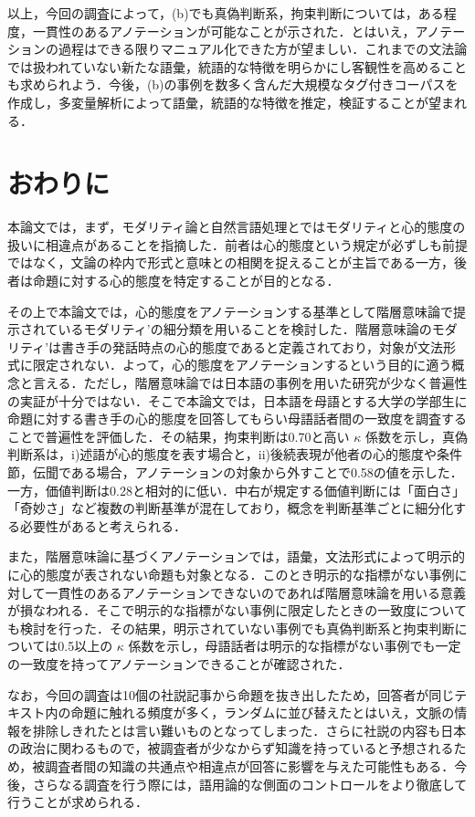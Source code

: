 \documentclass[japanese]{jnlp_1.4}
\begin{document}
以上，今回の調査によって，(b)でも真偽判断系，拘束判断については，ある程度，一貫性のあるアノテーションが可能なことが示された．とはいえ，アノテーションの過程はできる限りマニュアル化できた方が望ましい．これまでの文法論では扱われていない新たな語彙，統語的な特徴を明らかにし客観性を高めることも求められよう．今後，(b)の事例を数多く含んだ大規模なタグ付きコーパスを作成し，多変量解析によって語彙，統語的な特徴を推定，検証することが望まれる．



\section{おわりに}

本論文では，まず，モダリティ論と自然言語処理とではモダリティと心的態度の扱いに相違点があることを指摘した．前者は心的態度という規定が必ずしも前提ではなく，文論の枠内で形式と意味との相関を捉えることが主旨である一方，後者は命題に対する心的態度を特定することが目的となる．

その上で本論文では，心的態度をアノテーションする基準として階層意味論で提示されているモダリティ’の細分類を用いることを検討した．階層意味論のモダリティ’は書き手の発話時点の心的態度であると定義されており，対象が文法形式に限定されない．よって，心的態度をアノテーションするという目的に適う概念と言える．ただし，階層意味論では日本語の事例を用いた研究が少なく普遍性の実証が十分ではない．そこで本論文では，日本語を母語とする大学の学部生に命題に対する書き手の心的態度を回答してもらい母語話者間の一致度を調査することで普遍性を評価した．その結果，拘束判断は0.70と高い $\kappa$ 係数を示し，真偽判断系は，i)述語が心的態度を表す場合と，ii)後続表現が他者の心的態度や条件節，伝聞である場合，アノテーションの対象から外すことで0.58の値を示した．一方，価値判断は0.28と相対的に低い．中右が規定する価値判断には「面白さ」「奇妙さ」など複数の判断基準が混在しており，概念を判断基準ごとに細分化する必要性があると考えられる．

また，階層意味論に基づくアノテーションでは，語彙，文法形式によって明示的に心的態度が表されない命題も対象となる．このとき明示的な指標がない事例に対して一貫性のあるアノテーションできないのであれば階層意味論を用いる意義が損なわれる．そこで明示的な指標がない事例に限定したときの一致度についても検討を行った．その結果，明示されていない事例でも真偽判断系と拘束判断については0.5以上の $\kappa$ 係数を示し，母語話者は明示的な指標がない事例でも一定の一致度を持ってアノテーションできることが確認された．

なお，今回の調査は10個の社説記事から命題を抜き出したため，回答者が同じテキスト内の命題に触れる頻度が多く，ランダムに並び替えたとはいえ，文脈の情報を排除しきれたとは言い難いものとなってしまった．さらに社説の内容も日本の政治に関わるもので，被調査者が少なからず知識を持っていると予想されるため，被調査者間の知識の共通点や相違点が回答に影響を与えた可能性もある．今後，さらなる調査を行う際には，語用論的な側面のコントロールをより徹底して行うことが求められる．
\end{document}
